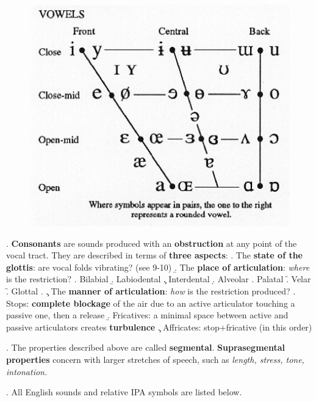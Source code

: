 \documentclass[11pt, oneside]{article}   	%
\begin{document}
\begin{figure}[h!]
\centering
\includegraphics{vowels}
\end{figure}

\ex. {\bfseries Consonants} are sounds produced with an {\bfseries obstruction} at any point of the vocal tract. They are described in terms of {\bfseries three aspects}:
\a. The {\bfseries state of the glottis}: are vocal folds vibrating? (see 9-10)
\b. The {\bfseries place of articulation}: {\itshape where} is the restriction?
	\a. Bilabial	
	\b. Labiodental	
	\c. Interdental		
	\d. Alveolar
	\e. Palatal
	\f. Velar
	\f. Glottal
	\z.
\c. The {\bfseries manner of articulation}: {\itshape how} is the restriction produced?
	\a. Stops: {\bfseries complete blockage} of the air due to an active articulator touching a passive one, then a release
	\b. Fricatives: a minimal space between active and passive articulators creates {\bfseries turbulence}
	\c. Affricates: stop+fricative (in this order)

\ex. The properties described above are called {\bfseries segmental}. {\bfseries Suprasegmental properties} concern with larger stretches of speech, such as {\itshape length, stress, tone, intonation.}

\ex. All English sounds and relative IPA symbols are listed below.
\end{document}
